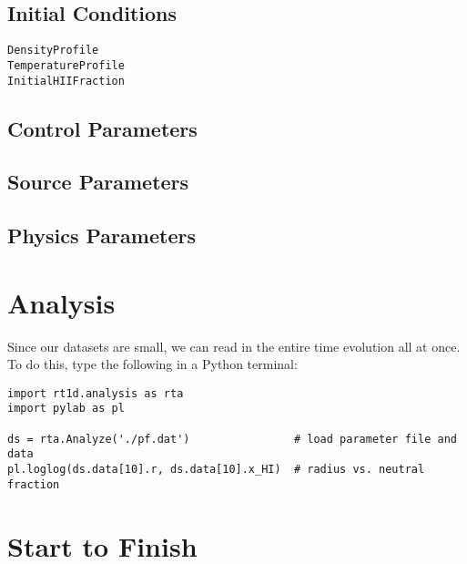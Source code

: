 \documentclass[letterpaper,titlepage,12pt]{article}
\numberwithin{equation}{section}
\begin{document}
\subsection{Initial Conditions}
\begin{description}
    
\item [\texttt{DensityProfile}]  

\item [\texttt{TemperatureProfile}]

\item [\texttt{InitialHIIFraction}]  

\end{description}


\subsection{Control Parameters}


\subsection{Source Parameters}


\subsection{Physics Parameters}


\section{Analysis}
Since our datasets are small, we can read in the entire time evolution all at once.  To do this, type the following in a Python terminal:
\begin{verbatim}
import rt1d.analysis as rta
import pylab as pl

ds = rta.Analyze('./pf.dat')                # load parameter file and data
pl.loglog(ds.data[10].r, ds.data[10].x_HI)  # radius vs. neutral fraction
\end{verbatim}

\section{Start to Finish}

\end{document}
